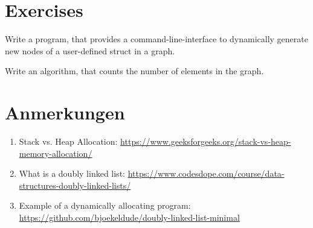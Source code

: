 \documentclass{dcbl/challenge}
\begin{document}
\section*{Exercises}
\begin{aufgabe}
    Write a program, that provides a command-line-interface to dynamically generate new nodes of a user-defined struct in a graph.
\end{aufgabe}

\begin{aufgabe}
    Write an algorithm, that counts the number of elements in the graph.
\end{aufgabe}

\section*{Anmerkungen}
\begin{enumerate}
    \item Stack vs. Heap Allocation: \url{https://www.geeksforgeeks.org/stack-vs-heap-memory-allocation/}
    \item What is a doubly linked list: \url{https://www.codesdope.com/course/data-structures-doubly-linked-lists/}
    \item Example of a dynamically allocating program: \url{https://github.com/bjoekeldude/doubly-linked-list-minimal}
\end{enumerate}
\end{document}
